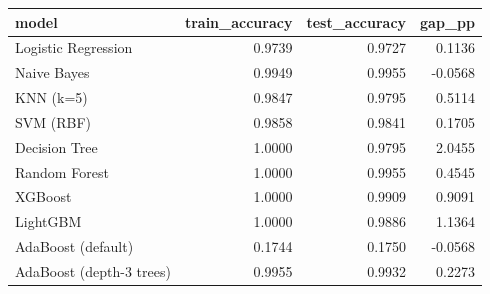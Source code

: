 \begin{tabular}{lrrr}
\toprule
model & train_accuracy & test_accuracy & gap_pp \\
\midrule
Logistic Regression & 0.9739 & 0.9727 & 0.1136 \\
Naive Bayes & 0.9949 & 0.9955 & -0.0568 \\
KNN (k=5) & 0.9847 & 0.9795 & 0.5114 \\
SVM (RBF) & 0.9858 & 0.9841 & 0.1705 \\
Decision Tree & 1.0000 & 0.9795 & 2.0455 \\
Random Forest & 1.0000 & 0.9955 & 0.4545 \\
XGBoost & 1.0000 & 0.9909 & 0.9091 \\
LightGBM & 1.0000 & 0.9886 & 1.1364 \\
AdaBoost (default) & 0.1744 & 0.1750 & -0.0568 \\
AdaBoost (depth-3 trees) & 0.9955 & 0.9932 & 0.2273 \\
\bottomrule
\end{tabular}

